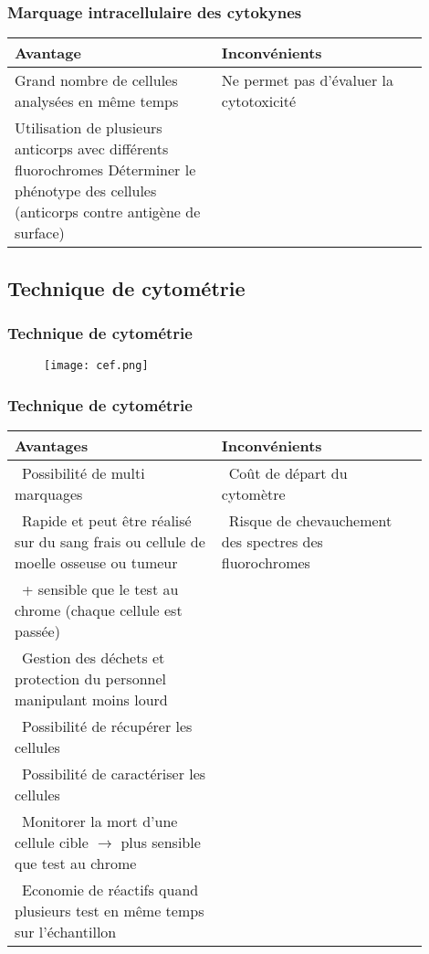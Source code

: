 \documentclass[12pt]{beamer}
\begin{document}
\begin{frame}
	\frametitle{Marquage intracellulaire des cytokynes}
	{\footnotesize
		\begin{tabular}{|p{0.45\linewidth}|p{0.45\linewidth}|}
			\hline
			Avantage & Inconvénients\\ 
			\hline
			\hline
			Grand nombre de cellules analysées en même temps & Ne permet pas d’évaluer la cytotoxicité \\ 
			Utilisation de plusieurs anticorps avec différents fluorochromes Déterminer le phénotype des cellules (anticorps contre antigène de surface) &  \\
			\hline
		\end{tabular} 
	}
\end{frame}


\subsection{Technique de cytométrie}

\begin{frame}
  \transuncover
  \frametitle{Technique de cytométrie}
  
  \begin{figure}
  	\texttt{[image: cef.png]}
  \end{figure}


\end{frame}

\begin{frame}
	\frametitle{Technique de cytométrie}
	{\scriptsize
\begin{tabular}{|p{0.45\linewidth}|p{0.45\linewidth}|}
	\hline
	Avantages & Inconvénients\\
	\hline
	\hline
	\textbullet~Possibilité de multi marquages & \textbullet~Coût de départ du cytomètre \\ 
	\textbullet~Rapide et peut être réalisé sur du sang frais ou cellule de moelle osseuse ou tumeur & \textbullet~Risque de chevauchement des spectres des fluorochromes \\ 
	\textbullet~+ sensible que le test au chrome (chaque cellule est passée) &  \\ 
	\textbullet~Gestion des déchets et protection du personnel manipulant moins lourd &  \\ 
	\textbullet~Possibilité de récupérer les cellules &  \\ 
	\textbullet~Possibilité de caractériser les cellules &  \\ 
	\textbullet~Monitorer la mort d’une cellule cible $ \rightarrow $ plus sensible que test au chrome &  \\ 
	\textbullet~Economie de réactifs quand plusieurs test en même temps sur l'échantillon & \\
	\hline
	
\end{tabular} 
}
\end{frame}
\end{document}
